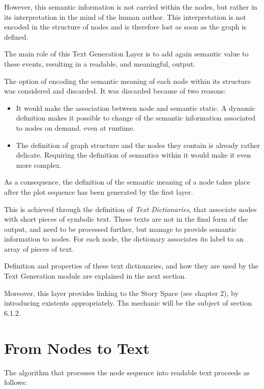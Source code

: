 \documentclass[12pt,a4paper,oneside]{report}
\begin{document}
However, this semantic information is not carried within the nodes, but rather in its interpretation in the mind of the human author. This interpretation is not encoded in the structure of nodes and is therefore lost as soon as the graph is defined.

The main role of this Text Generation Layer is to add again semantic value to these events, resulting in a readable, and meaningful, output.

\bigskip

The option of encoding the semantic meaning of each node within its structure was considered and discarded. It was discarded because of two reasons:

\begin{itemize}\setlength{\itemsep}{0pt}
\item It would make the association between node and semantic static. A dynamic definition makes it possible to change of the semantic information associated to nodes on demand. even at runtime.
\item The definition of graph structure and the nodes they contain is already rather delicate. Requiring the definition of semantics within it would make it even more complex.
\end{itemize}

As a consequence, the definition of the semantic meaning of a node takes place after the plot sequence has been generated by the first layer.

This is achieved through the definition of \textit{Text Dictionaries}, that associate nodes with short pieces of symbolic text. These texts are not in the final form of the output, and need to be processed further, but manage to provide semantic information to nodes. For each node, the dictionary associates its label to an array of pieces of text.

Definition and properties of these text dictionaries, and how they are used by the Text Generation module are explained in the next section.

Moreover, this layer provides linking to the Story Space (see chapter 2), by introducing existents appropriately. Ths mechanic will be the subject of section 6.1.2.

\pagebreak

\section{From Nodes to Text}
The algorithm that processes the node sequence into readable text proceeds as follows:
\end{document}
